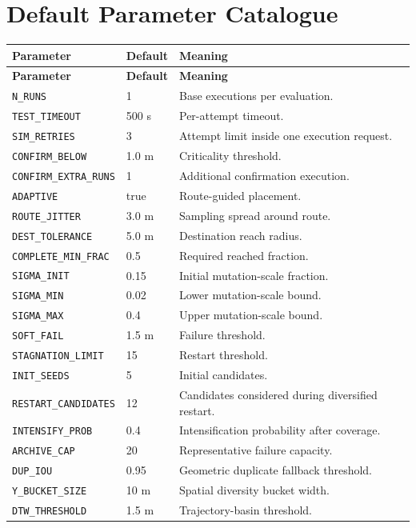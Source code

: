 \documentclass[11pt,a4paper]{report}
\newcommand{\code}[1]{\texttt{#1}}
\begin{document}
\chapter{Default Parameter Catalogue}
\begin{longtable}{L{4.3cm} L{2.4cm} L{7.8cm}}
\toprule
\textbf{Parameter} & \textbf{Default} & \textbf{Meaning}\\
\midrule
\endfirsthead
\toprule
\textbf{Parameter} & \textbf{Default} & \textbf{Meaning}\\
\midrule
\endhead
\code{N\_RUNS} & 1 & Base executions per evaluation.\\
\code{TEST\_TIMEOUT} & 500 s & Per-attempt timeout.\\
\code{SIM\_RETRIES} & 3 & Attempt limit inside one execution request.\\
\code{CONFIRM\_BELOW} & 1.0 m & Criticality threshold.\\
\code{CONFIRM\_EXTRA\_RUNS} & 1 & Additional confirmation execution.\\
\code{ADAPTIVE} & true & Route-guided placement.\\
\code{ROUTE\_JITTER} & 3.0 m & Sampling spread around route.\\
\code{DEST\_TOLERANCE} & 5.0 m & Destination reach radius.\\
\code{COMPLETE\_MIN\_FRAC} & 0.5 & Required reached fraction.\\
\code{SIGMA\_INIT} & 0.15 & Initial mutation-scale fraction.\\
\code{SIGMA\_MIN} & 0.02 & Lower mutation-scale bound.\\
\code{SIGMA\_MAX} & 0.4 & Upper mutation-scale bound.\\
\code{SOFT\_FAIL} & 1.5 m & Failure threshold.\\
\code{STAGNATION\_LIMIT} & 15 & Restart threshold.\\
\code{INIT\_SEEDS} & 5 & Initial candidates.\\
\code{RESTART\_CANDIDATES} & 12 & Candidates considered during diversified restart.\\
\code{INTENSIFY\_PROB} & 0.4 & Intensification probability after coverage.\\
\code{ARCHIVE\_CAP} & 20 & Representative failure capacity.\\
\code{DUP\_IOU} & 0.95 & Geometric duplicate fallback threshold.\\
\code{Y\_BUCKET\_SIZE} & 10 m & Spatial diversity bucket width.\\
\code{DTW\_THRESHOLD} & 1.5 m & Trajectory-basin threshold.\\

\end{longtable}
\end{document}
